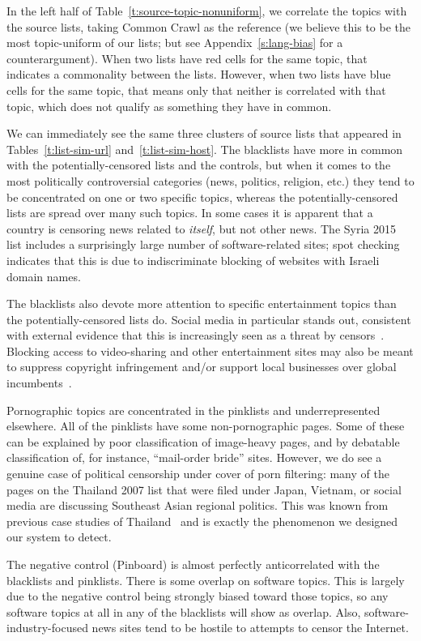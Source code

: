 In the left half of Table~\ref{t:source-topic-nonuniform}, we
correlate the topics with the source lists, taking Common Crawl as the
reference (we believe this to be the most topic-uniform of our lists;
but see Appendix~\ref{s:lang-bias} for a counterargument).  When two
lists have red cells for the same topic, that indicates a commonality
between the lists.  However, when two lists have blue cells for the
same topic, that means only that neither is correlated with that
topic, which does not qualify as something they have in common.

We can immediately see the same three clusters of source lists that
appeared in Tables~\ref{t:list-sim-url} and~\ref{t:list-sim-host}.
The blacklists have more in common with the potentially-censored lists
and the controls, but when it comes to the most politically
controversial categories (news, politics, religion, etc.) they tend to
be concentrated on one or two specific topics, whereas the
potentially-censored lists are spread over many such topics.  In some
cases it is apparent that a country is censoring news related to
\emph{itself}, but not other news.  The Syria 2015 list includes a
surprisingly large number of software-related sites; spot checking
indicates that this is due to indiscriminate blocking of websites
with Israeli domain names.

The blacklists also devote more attention to specific entertainment
topics than the potentially-censored lists do.  Social media in
particular stands out, consistent with external evidence that this is
increasingly seen as a threat by censors~\cite{oni2011contested}.
Blocking access to video-sharing and other entertainment sites may
also be meant to suppress copyright infringement and/or support local
businesses over global incumbents~\cite{khattak.2014.isp}.

Pornographic topics are concentrated in the pinklists and
underrepresented elsewhere.  All of the pinklists have some
non-pornographic pages.  Some of these can be explained by poor
classification of image-heavy pages, and by debatable classification
of, for instance, “mail-order bride” sites.  However, we do see a
genuine case of political censorship under cover of porn filtering:
many of the pages on the Thailand 2007 list that were filed under
Japan, Vietnam, or social media are discussing Southeast Asian
regional politics.  This was known from previous case studies of
Thailand~\cite{oni.thailand} and is exactly the phenomenon we designed
our system to detect.

The negative control (Pinboard) is almost perfectly anticorrelated
with the blacklists and pinklists.  There is some overlap on software
topics.  This is largely due to the negative control being strongly
biased toward those topics, so any software topics at all in any of
the blacklists will show as overlap.  Also, software-industry-focused
news sites tend to be hostile to attempts to censor the Internet.

